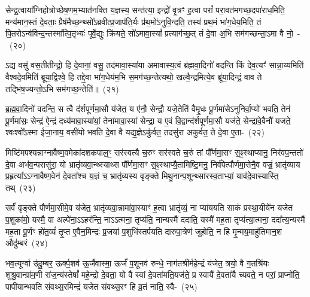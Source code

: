 सेन्द्र॒त्वाया᳚ग्निहोत्रोच्छेष॒णम॒भ्यात॑नक्ति य॒ज्ञस्य॒ सन्त॑त्या॒ इन्द्रो॑ वृ॒त्रꣳ ह॒त्वा परां᳚ परा॒वत॑मगच्छ॒दपा॑राध॒मिति॒ मन्य॑मान॒स्तं दे॒वताः॒ प्रैष॑मैच्छ॒न्थ्सो᳚\-ऽब्रवीत्प्र॒जा\-प॑ति॒र्यः प्र॑थ॒मो॑\-ऽनुवि॒न्दति॒ तस्य॑ प्रथ॒मं भा॑ग॒धेय॒मिति॒ तं पि॒तरो\-ऽन्व॑विन्द॒न्तस्मा᳚त्पि॒तृभ्यः॑ पूर्वे॒द्युः क्रि॑यते॒ सो॑\-ऽमावा॒स्यां᳚ प्रत्याग॑च्छ॒त् तं दे॒वा अ॒भि सम॑गच्छन्ता॒ऽमा वै नो॒~-~(२०)

ऽद्य वसु॑ वस॒तीतीन्द्रो॒ हि दे॒वानां॒ वसु॒ तद॑मावा॒स्या॑या अमावास्य॒त्वं ब्र॑ह्मवा॒दिनो॑ वदन्ति किं देव॒त्यꣳ॑ सान्ना॒य्यमिति॑ वैश्वदे॒वमिति॑ ब्रूया॒द्विश्वे॒ हि तद्दे॒वा भा॑ग॒धेय॑म॒भि स॒मग॑च्छ॒न्तेत्यथो॒ खल्वै॒न्द्रमित्ये॒व ब्रू॑या॒दिन्द्रं॒ वाव ते तद्भि॑ष॒ज्यन्तो॒\-ऽभि सम॑गच्छ॒न्तेति॑॥~(२१)

{}%

ब्र॒ह्म॒वा॒दिनो॑ वदन्ति॒ स त्वै द॑र्\mbox{}शपूर्णमा॒सौ य॑जेत॒ य ए॑नौ॒ सेन्द्रौ॒ यजे॒तेति॑ वैमृ॒धः पू॒र्णमा॑से\-ऽनुनिर्वा॒प्यो॑ भवति॒ तेन॑ पू॒र्णमा॑सः॒ सेन्द्र॑ ऐ॒न्द्रं दध्य॑मावा॒स्या॑यां॒ तेना॑मावा॒स्या॑ सेन्द्रा॒ य ए॒वं वि॒द्वान्द॑र्\mbox{}शपूर्णमा॒सौ यज॑ते॒ सेन्द्रा॑वे॒वैनौ॑ यजते॒ श्वःश्वो᳚\-ऽस्मा ईजा॒नाय॒ वसी॑यो भवति दे॒वा वै यद्य॒ज्ञे\-ऽकु॑र्वत॒ तदसु॑रा अकुर्वत॒ ते दे॒वा ए॒ता-~(२२)

मिष्टि॑मपश्यन्नाग्नावैष्ण॒वमेका॑\-दश\-कपाल॒ꣳ॒ सर॑स्वत्यै च॒रुꣳ सर॑स्वते च॒रुं तां पौ᳚र्णमा॒सꣳ स॒ꣴ॒स्थाप्यानु॒ निर॑वप॒न्ततो॑ दे॒वा अभ॑व॒न्परासु॑रा॒ यो भ्रातृ॑व्यवा॒न्थ्स्याथ्स पौ᳚र्णमा॒सꣳ स॒ꣴ॒स्थाप्यै॒तामिष्टि॒मनु॒ निर्व॑पेत्पौर्णमा॒सेनै॒व वज्रं॒ भ्रातृ॑व्याय प्र॒हृत्या᳚ऽऽग्नावैष्ण॒वेन॑ दे॒वता᳚श्च य॒ज्ञं च॒ भ्रातृ॑व्यस्य वृङ्क्ते मिथु॒नान्प॒शून्थ्सा॑\-रस्व॒ताभ्यां॒ याव॑दे॒वास्यास्ति॒ तथ्~(२३)

सर्वं॑ वृङ्क्ते पौर्णमा॒सीमे॒व य॑जेत॒ भ्रातृ॑व्यवा॒न्नामा॑वा॒स्याꣳ॑ ह॒त्वा भ्रातृ॑व्यं॒ ना प्या॑ययति साकं प्रस्था॒यीये॑न यजेत प॒शुका॑मो॒ यस्मै॒ वा अल्पे॑ना॒ऽऽहर॑न्ति॒ नाऽऽत्मना॒ तृप्य॑ति॒ नान्यस्मै॑ ददाति॒ यस्मै॑ मह॒ता तृप्य॑त्या॒त्मना॒ ददा᳚त्य॒न्यस्मै॑ मह॒ता पू॒र्णꣳ हो॑त॒व्यं॑ तृ॒प्त ए॒वैन॒मिन्द्रः॑ प्र॒जया॑ प॒शुभि॑स्तर्पयति दारुपा॒त्रेण॑ जुहोति॒ न हि मृ॒न्मय॒माहु॑तिमान॒श औदु॑म्बरं~(२४)

भव॒त्यूर्ग्वा उ॑दु॒म्बर॒ ऊर्क्प॒शव॑ ऊ॒र्जैवास्मा॒ ऊर्जं॑ प॒शूनव॑ रुन्धे॒ नाग॑तश्रीर्महे॒न्द्रं य॑जेत॒ त्रयो॒ वै ग॒तश्रि॑यः शुश्रु॒वान्ग्रा॑म॒णी रा॑ज॒न्य॑स्तेषां᳚ महे॒न्द्रो दे॒वता॒ यो वै स्वां दे॒वता॑मति॒यज॑ते॒ प्र स्वायै॑ दे॒वता॑यै च्यवते॒ न परां॒ प्राप्नो॑ति॒ पापी॑यान्भवति संवथ्स॒रमिन्द्रं॑ यजेत संवथ्स॒रꣳ हि व्र॒तं नाति॒ स्वै-~(२५)

